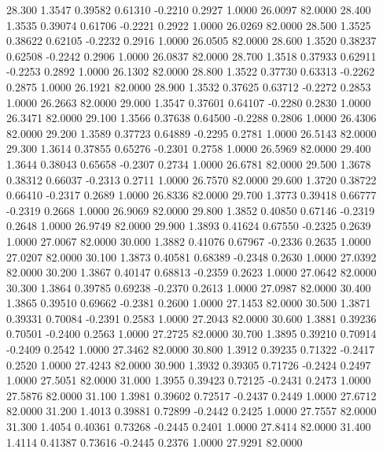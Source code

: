   28.300   1.3547   0.39582   0.61310  -0.2210   0.2927   1.0000  26.0097  82.0000
  28.400   1.3535   0.39074   0.61706  -0.2221   0.2922   1.0000  26.0269  82.0000
  28.500   1.3525   0.38622   0.62105  -0.2232   0.2916   1.0000  26.0505  82.0000
  28.600   1.3520   0.38237   0.62508  -0.2242   0.2906   1.0000  26.0837  82.0000
  28.700   1.3518   0.37933   0.62911  -0.2253   0.2892   1.0000  26.1302  82.0000
  28.800   1.3522   0.37730   0.63313  -0.2262   0.2875   1.0000  26.1921  82.0000
  28.900   1.3532   0.37625   0.63712  -0.2272   0.2853   1.0000  26.2663  82.0000
  29.000   1.3547   0.37601   0.64107  -0.2280   0.2830   1.0000  26.3471  82.0000
  29.100   1.3566   0.37638   0.64500  -0.2288   0.2806   1.0000  26.4306  82.0000
  29.200   1.3589   0.37723   0.64889  -0.2295   0.2781   1.0000  26.5143  82.0000
  29.300   1.3614   0.37855   0.65276  -0.2301   0.2758   1.0000  26.5969  82.0000
  29.400   1.3644   0.38043   0.65658  -0.2307   0.2734   1.0000  26.6781  82.0000
  29.500   1.3678   0.38312   0.66037  -0.2313   0.2711   1.0000  26.7570  82.0000
  29.600   1.3720   0.38722   0.66410  -0.2317   0.2689   1.0000  26.8336  82.0000
  29.700   1.3773   0.39418   0.66777  -0.2319   0.2668   1.0000  26.9069  82.0000
  29.800   1.3852   0.40850   0.67146  -0.2319   0.2648   1.0000  26.9749  82.0000
  29.900   1.3893   0.41624   0.67550  -0.2325   0.2639   1.0000  27.0067  82.0000
  30.000   1.3882   0.41076   0.67967  -0.2336   0.2635   1.0000  27.0207  82.0000
  30.100   1.3873   0.40581   0.68389  -0.2348   0.2630   1.0000  27.0392  82.0000
  30.200   1.3867   0.40147   0.68813  -0.2359   0.2623   1.0000  27.0642  82.0000
  30.300   1.3864   0.39785   0.69238  -0.2370   0.2613   1.0000  27.0987  82.0000
  30.400   1.3865   0.39510   0.69662  -0.2381   0.2600   1.0000  27.1453  82.0000
  30.500   1.3871   0.39331   0.70084  -0.2391   0.2583   1.0000  27.2043  82.0000
  30.600   1.3881   0.39236   0.70501  -0.2400   0.2563   1.0000  27.2725  82.0000
  30.700   1.3895   0.39210   0.70914  -0.2409   0.2542   1.0000  27.3462  82.0000
  30.800   1.3912   0.39235   0.71322  -0.2417   0.2520   1.0000  27.4243  82.0000
  30.900   1.3932   0.39305   0.71726  -0.2424   0.2497   1.0000  27.5051  82.0000
  31.000   1.3955   0.39423   0.72125  -0.2431   0.2473   1.0000  27.5876  82.0000
  31.100   1.3981   0.39602   0.72517  -0.2437   0.2449   1.0000  27.6712  82.0000
  31.200   1.4013   0.39881   0.72899  -0.2442   0.2425   1.0000  27.7557  82.0000
  31.300   1.4054   0.40361   0.73268  -0.2445   0.2401   1.0000  27.8414  82.0000
  31.400   1.4114   0.41387   0.73616  -0.2445   0.2376   1.0000  27.9291  82.0000

